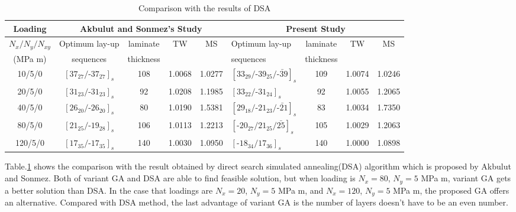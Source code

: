 \begin{table}
	\normalsize
\caption{Comparison with the results of DSA}
\label{tab:comparision}
\centering
\begin{tabular}{c|cccc|lccc}
	\toprule
	\textbf{Loading}	    & \multicolumn {4}{c}{\textbf{Akbulut and Sonmez's\cite{akbulut2008optimum} Study}}   & \multicolumn {4}{c}{\textbf{Present Study}}\\
	\midrule
	 $N_{x}/N_{y}/N_{xy}$   & Optimum lay-up			        & laminate  & TW & MS   & Optimum lay-up & laminate  & TW & MS \\
	  (MPa m)	            & sequences					        & thickness &    &      & sequences	     & thickness &    &    \\
	\midrule
	  10/5/0                 &  $[37_{27}/\text{-}37_{27}]_s$     &  108      &  1.0068  &  1.0277 & $[33_{29}/\text{-}39_{25}/\bar{\text{-}39}]_s$     &     109      &  1.0074      &  1.0246  \\
	  20/5/0                 &  $[31_{23}/\text{-}31_{23}]_s$     &  92       &  1.0208  &  1.1985 & $[33_{22}/\text{-}31_{24}]_s$                      &     92      &  1.0055       &  1.2065    \\
	  40/5/0                 &  $[26_{20}/\text{-}26_{20}]_s$     &  80       &  1.0190  &  1.5381 & $[29_{18}/\text{-}21_{23}/\bar{\text{-}21}]_s$     &     83      &  1.0034       &  1.7350   \\
	  80/5/0                 &  $[21_{25}/\text{-}19_{28}]_s$     &  106      &  1.0113  &  1.2213 & $[\text{-}20_{27}/21_{25}/\bar{25}]_s$             &     105      &  1.0029      &  1.2063    \\
	  120/5/0                &  $[17_{35}/\text{-}17_{35}]_s$     &  140      &  1.0030  &  1.0950 & $[\text{-}18_{34}/17_{36}]_s$                     &     140      &  1.0000      &  1.0898     \\
	\bottomrule
\end{tabular}
\end{table}

Table.\ref{tab:comparision} shows the comparison with the result obtained by
direct search simulated annealing(DSA) algorithm which is proposed by Akbulut
and Sonmez\cite{akbulut2008optimum}.  Both of variant GA and DSA are able to
find feasible solution, but when loading is $N_x=80$, $N_y=5$ MPa m, variant GA
gets a better solution than DSA. In the case that loadings are $N_x=20$, $N_y=5$ MPa m,
and $N_x=120$, $N_y=5$ MPa m,  the proposed GA offers an alternative. Compared
with DSA method, the last advantage of variant GA is the number of layers
doesn't have to be an even number.

